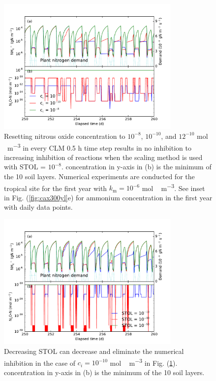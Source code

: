 \documentclass[gmd, manuscript]{copernicus}
\begin{document}
\begin{figure}[t]
\includegraphics[width=0.8\textwidth]{../figs/fig18/cax1yn2o.pdf}
\caption{Resetting nitrous oxide concentration to $10^{-8}$, $10^{-10}$, and
$12^{-10}$ \unit{mol\,m^{-3}} in every CLM 0.5 h time step results in no
inhibition to increasing inhibition of reactions when the scaling method is
used with STOL = $10^{-8}$.  concentration in y-axis in (b) is the
minimum of the 10 soil layers. Numerical experiments are conducted for the
tropical site for the first year with $k_\text{m}=10^{-6}$ \unit{mol\,m^{-3}}.
See inset in Fig. (\ref{fig:cax300yl}e) for ammonium concentration in the first
year with daily data points.}
\label{fig:cax1yn2o}
\end{figure}

\begin{figure}[t]
\includegraphics[width=0.8\textwidth]{../figs/fig19/cax1yn2ostol0.pdf}
\caption{Decreasing STOL can decrease and eliminate the numerical inhibition in
the case of $c_i = 10^{-10}$  \unit{mol\,m^{-3}}  in Fig. (\ref{fig:cax1yn2o}).
 concentration in y-axis in (b) is the minimum of the 10 soil
layers.}
\label{fig:cax1yn2osto0}
\end{figure}
\end{document}
